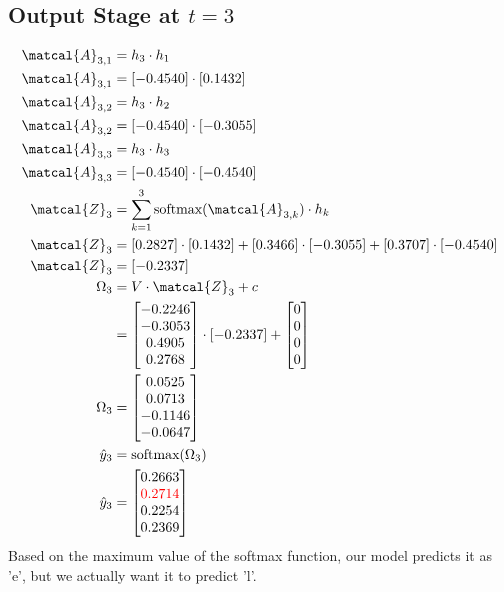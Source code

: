 \documentclass{article}
\begin{document}
\subsection*{Output Stage at $t=3$}
\begin{align*}
\matcal{A}_{3,1} &= h_3 \cdot h_1 \\
\matcal{A}_{3,1} &= [-0.4540] \cdot [0.1432] \\
\matcal{A}_{3,2} &= h_3 \cdot h_2 \\
\matcal{A}_{3,2} &= [-0.4540] \cdot [-0.3055] \\
\matcal{A}_{3,3} &= h_3 \cdot h_3 \\
\matcal{A}_{3,3} &= [-0.4540] \cdot [-0.4540] \\
\matcal{Z}_3 &= \sum_{k=1}^3 \text{softmax}(\matcal{A}_{3,k}) \cdot h_k \\
\matcal{Z}_3 &= [0.2827] \cdot [0.1432] + [0.3466] \cdot [-0.3055]+ [0.3707] \cdot [-0.4540]\\
\matcal{Z}_3 &= [-0.2337] \\
\Omega_3 &= V \cdot \matcal{Z}_3 + c \\
 &= \begin{bmatrix} -0.2246 \\ -0.3053 \\ 0.4905 \\ 0.2768 \end{bmatrix} \cdot [-0.2337] + \begin{bmatrix} 0 \\ 0 \\ 0 \\ 0\end{bmatrix}\\
\Omega_3 &= \begin{bmatrix} 0.0525 \\ 0.0713 \\ -0.1146 \\ -0.0647 \end{bmatrix} \\
\hat{y}_3 &= \text{softmax}(\Omega_3) \\
\hat{y}_3 &= \begin{bmatrix} 0.2663 \\ \textcolor{red}{0.2714} \\ 0.2254 \\ 0.2369 \end{bmatrix} \\
\end{align*}
Based on the maximum value of the softmax function, our model predicts it as 'e', but we actually want it to predict 'l'.
\end{document}
